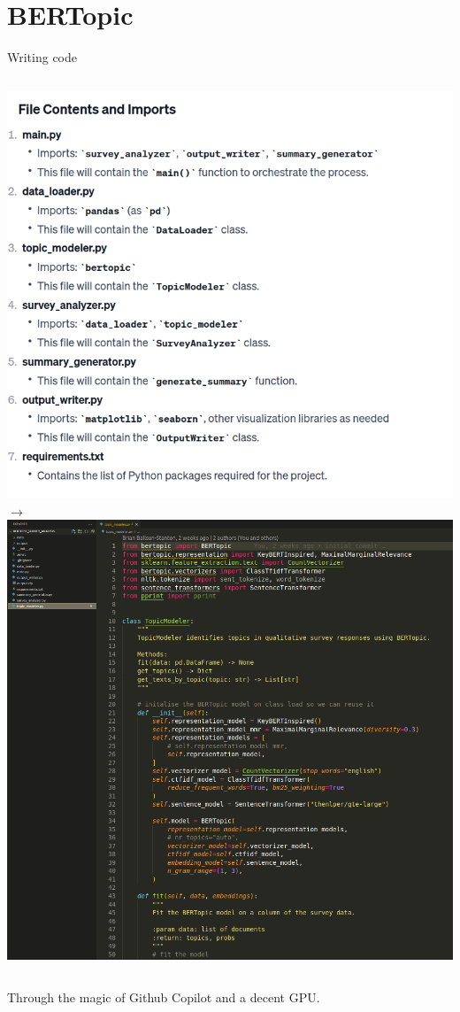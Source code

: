 \documentclass[xcolor={dvipsnames},aspectratio=169]{beamer}
\begin{document}
\section{BERTopic}
\begin{frame}{Writing code}


\begin{columns}

\includegraphics[width=\textwidth]{Screenshot from 2023-12-12 11-42-45.png}
$\rightarrow$
\includegraphics[width=\textwidth]{Screenshot from 2023-12-12 11-46-10.png}
\end{columns}
Through the magic of Github Copilot and a decent GPU. 
\end{frame}
\end{document}
